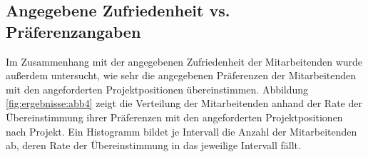 \subsection{Angegebene Zufriedenheit vs. Präferenzangaben}
Im Zusammenhang mit der angegebenen Zufriedenheit der Mitarbeitenden wurde außerdem untersucht, wie sehr die angegebenen Präferenzen der Mitarbeitenden mit den angeforderten Projektpositionen übereinstimmen.
Abbildung \ref{fig:ergebnisse:abb4} zeigt die Verteilung der Mitarbeitenden anhand der Rate der Übereinstimmung ihrer Präferenzen mit den angeforderten Projektpositionen nach Projekt.
Ein Histogramm bildet je Intervall die Anzahl der Mitarbeitenden ab, deren Rate der Übereinstimmung in das jeweilige Intervall fällt.

\begin{figure}[H]
    \centering
    \\

\end{figure}

